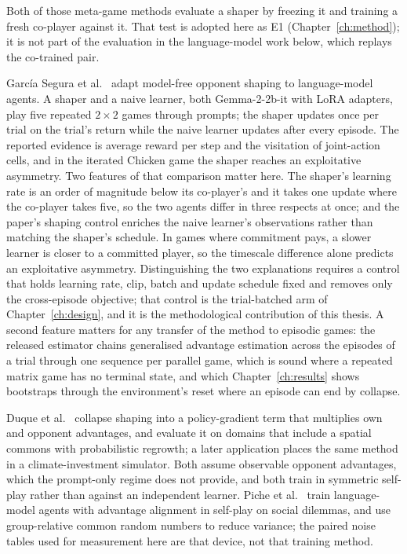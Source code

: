 Both of those meta-game methods evaluate a shaper by freezing it and
training a fresh co-player against it.
That test is adopted here as E1 (Chapter~\ref{ch:method}); it is not part of
the evaluation in the language-model work below, which replays the
co-trained pair.

Garc\'ia Segura et al.\ \cite{garciasegura2025} adapt model-free opponent
shaping to language-model agents.
A shaper and a naive learner, both Gemma-2-2b-it with LoRA adapters, play
five repeated \(2\times2\) games through prompts; the shaper updates once per
trial on the trial's return while the naive learner updates after every
episode.
The reported evidence is average reward per step and the visitation of
joint-action cells, and in the iterated Chicken game the shaper reaches an
exploitative asymmetry.
Two features of that comparison matter here.
The shaper's learning rate is an order of magnitude below its co-player's
and it takes one update where the co-player takes five, so the two agents
differ in three respects at once; and the paper's shaping control enriches
the naive learner's observations rather than matching the shaper's schedule.
In games where commitment pays, a slower learner is closer to a committed
player, so the timescale difference alone predicts an exploitative
asymmetry.
Distinguishing the two explanations requires a control that holds learning
rate, clip, batch and update schedule fixed and removes only the
cross-episode objective; that control is the trial-batched arm of
Chapter~\ref{ch:design}, and it is the methodological contribution of this
thesis.
A second feature matters for any transfer of the method to episodic games:
the released estimator chains generalised advantage estimation across the
episodes of a trial through one sequence per parallel game, which is sound
where a repeated matrix game has no terminal state, and which
Chapter~\ref{ch:results} shows bootstraps through the environment's reset
where an episode can end by collapse.

Duque et al.\ \cite{duque2025} collapse shaping into a policy-gradient term
that multiplies own and opponent advantages, and evaluate it on domains that
include a spatial commons with probabilistic regrowth; a later application
\cite{duque2026} places the same method in a climate-investment simulator.
Both assume observable opponent advantages, which the prompt-only regime
does not provide, and both train in symmetric self-play rather than against
an independent learner.
Piche et al.\ \cite{piche2025} train language-model agents with advantage
alignment in self-play on social dilemmas, and use group-relative common
random numbers to reduce variance; the paired noise tables used for
measurement here are that device, not that training method.


